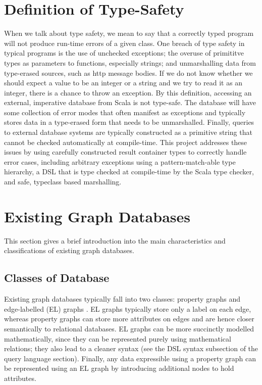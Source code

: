 \documentclass[12pt,a4paper,twoside,openright]{report}
\begin{document}
\section{Definition of Type-Safety}
When we talk about type safety, we mean to say that a correctly typed program will not produce run-time errors of a given class. One breach of  type safety in typical programs is the use of unchecked exceptions; the overuse of primititve types as parameters to functions, especially strings; and unmarshalling data from type-erased sources, such as http message bodies. If we do not know whether we should expect a value to be an integer or a string and we try to read it as an integer, there is a chance to throw an exception. 
By this definition, accessing an external, imperative database from Scala is not type-safe. The database will have some collection of error modes that often manifest as exceptions and typically stores data in a type-erased form that needs to be unmarshalled. Finally, queries to external database systems are typically constructed as a primitive string that cannot be checked automatically at compile-time. This project addresses these issues by using carefully constructed result container types to correctly handle error cases, including arbitrary exceptions using a pattern-match-able type hierarchy, a DSL that is type checked at compile-time by the Scala type checker, and safe, typeclass based marshalling.


\section{Existing Graph Databases}
This section gives a brief introduction into the main characteristics and classifications of existing graph databases.
\subsection{Classes of Database}
Existing graph databases typically fall into two classes: property graphs and edge-labelled (EL) graphs \cite{QueryLanguageFoundations}. EL graphs typically store only a label on each edge, whereas property graphs can store more attributes on edges and are hence closer semantically to relational databases. EL graphs can be more succinctly modelled mathematically, since they can be represented purely using mathematical relations; they also lead to a cleaner syntax (see the DSL syntax subsection of the query language section). Finally, any data expressible using a property graph can be represented using an EL graph by introducing additional nodes to hold attributes.
\end{document}
